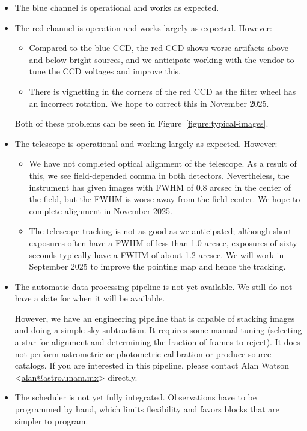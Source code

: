 \begin{itemize}

\item 
The blue channel is operational and works as expected. 

\item 
The red channel is operation and works largely as expected. However:

\begin{itemize}
    \item Compared to the blue CCD, the red CCD shows worse artifacts above and below bright sources, and we anticipate working with the vendor to tune the CCD voltages and improve this.
    \item There is vignetting in the corners of the red CCD as the filter wheel has an incorrect rotation. We hope to correct this in November 2025.
\end{itemize}

Both of these problems can be seen in Figure~\ref{figure:typical-images}.

\item 
The telescope is operational and working largely as expected. However: 

\begin{itemize}
    \item We have not completed optical alignment of the telescope. As a result of this, we see field-depended comma in both detectors. Nevertheless, the instrument has given images with FWHM of 0.8 arcsec in the center of the field, but the FWHM is worse away from the field center. We hope to complete alignment in November 2025.
    \item The telescope tracking is not as good as we anticipated; although short exposures often have a FWHM of less than 1.0 arcsec, exposures of sixty seconds typically have a FWHM of about 1.2 arcsec. We will work in September 2025 to improve the pointing map and hence the tracking.
\end{itemize}

\item
The automatic data-processing pipeline is not yet available. We still do not have a date for when it will be available. 

However, we have an engineering pipeline that is capable of stacking images and doing a simple sky subtraction. It requires some manual tuning (selecting a star for alignment and determining the fraction of frames to reject). It does not perform astrometric or photometric calibration or produce source catalogs. If you are interested in this pipeline, please contact Alan Watson <\href{mailto:alan@astro.unam.mx}{alan@astro.unam.mx}> directly.

\item
The scheduler is not yet fully integrated. Observations have to be programmed by hand, which limits flexibility and favors blocks that are simpler to program.

\end{itemize}

